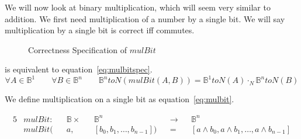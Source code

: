 \documentclass[14pt]{extarticle}  %
\theoremstyle{plain}
\theoremstyle{definition}
\theoremstyle{remark}
\begin{document}
We will now look at binary multiplication, which will seem very similar to addition. We first need multiplication
of a number by a single bit. We will say multiplication by a single bit is correct iff  commutes.
\begin{figure}
\centering
\caption{Correctness Specification of $mulBit$}
\label{fig:mulbitspec}
\end{figure}

 is equivalent to equation~\ref{eq:mulbitspec}.
\begin{equation}\label{eq:mulbitspec}
  \forall A \in \mathbb{B}^{1} \qquad \forall B \in \mathbb{B}^{n} \qquad \mathbb{B}^{n}toN(mulBit(A,B)) = \mathbb{B}^{1}toN(A) \cdot_{N} \mathbb{B}^{n}toN(B)
\end{equation}


We define multiplication on a single bit as equation~\ref{eq:mulbit}.

\begin{alignat}{5}\label{eq:mulbit}
  &mulBit : &&\mathbb{B} \times &&\mathbb{B}^{n} &&\to &&\mathbb{B}^{n}\\
  &mulBit(&&a, &&[b_{0}, b_{1},\ldots,b_{n-1}]) &&= &&[a \land b_{0}, a\land b_{1}, \ldots, a \land b_{n-1}]
\end{alignat}
\end{document}
